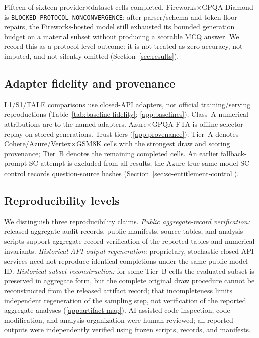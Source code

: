 Fifteen of sixteen provider$\times$dataset cells completed. Fireworks$\times$GPQA-Diamond is
\texttt{BLOCKED\_PROTOCOL\_NONCONVERGENCE}: after parser/schema and token-floor repairs, the
Fireworks-hosted model still exhausted its bounded generation budget on a material subset without
producing a scorable MCQ answer. We record this as a protocol-level outcome: it is not treated as
zero accuracy, not imputed, and not silently omitted (Section~\ref{sec:results}).

\subsection{Adapter fidelity and provenance}
\label{sec:setup-baselines}

L1/S1/TALE comparisons use closed-API adapters, not official training/serving reproductions
(Table~\ref{tab:baseline-fidelity}; \ref{app:baselines}). Class~A numerical attributions
are to the named adapters. Azure$\times$GPQA FTA is offline selector replay on stored generations.
Trust tiers (\ref{app:provenance}): Tier~A denotes Cohere/Azure/Vertex$\times$GSM8K cells
with the strongest draw and scoring provenance; Tier~B denotes the remaining completed cells. An
earlier fallback-prompt SC attempt is excluded from all results; the Azure true same-model SC
control records question-source hashes (Section~\ref{sec:sc-entitlement-control}).

\begin{table}[h]
\centering
\caption{Baseline fidelity disclosure. None is an official training/serving reproduction.}
\label{tab:baseline-fidelity}

\end{table}

\subsection{Reproducibility levels}
\label{sec:setup-repro}

We distinguish three reproducibility claims. \emph{Public aggregate-record verification:} released
aggregate audit records, public manifests, source tables, and analysis scripts support
aggregate-record verification of the reported tables and numerical invariants. \emph{Historical
API-output regeneration:}
proprietary, stochastic closed-API services need not reproduce identical completions under the same
public model ID. \emph{Historical subset reconstruction:} for some Tier~B cells the evaluated subset
is preserved in aggregate form, but the complete original draw procedure cannot be reconstructed from
the released artifact record; that incompleteness limits independent regeneration of the sampling
step, not verification of the reported aggregate analyses (\ref{app:artifact-map}). AI-assisted code
inspection, code modification, and analysis organization were human-reviewed; all reported outputs
were independently verified using frozen scripts, records, and manifests.
